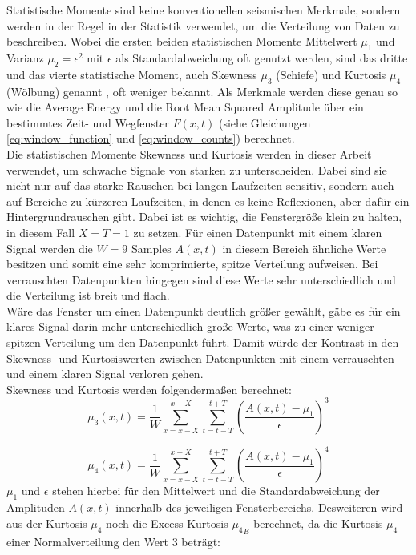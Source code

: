 Statistische Momente sind keine konventionellen seismischen Merkmale, sondern werden in der Regel in der Statistik verwendet, um die Verteilung von Daten zu beschreiben. Wobei die ersten beiden statistischen Momente Mittelwert $\mu_1$ und Varianz $\mu_2 = \epsilon^2$ mit $\epsilon$ als Standardabweichung oft genutzt werden, sind das dritte und das vierte statistische Moment, auch Skewness $\mu_3$ (Schiefe) und Kurtosis $\mu_4$ (Wölbung) genannt \parencite{guthrie_nistsematech_2020}, oft weniger bekannt. Als Merkmale werden diese genau so wie die Average Energy und die Root Mean Squared Amplitude über ein bestimmtes Zeit- und Wegfenster $F(x,t)$ (siehe Gleichungen \ref{eq:window_function} und \ref{eq:window_counts}) berechnet. \\
Die statistischen Momente Skewness und Kurtosis werden in dieser Arbeit verwendet, um schwache Signale von starken zu unterscheiden. Dabei sind sie nicht nur auf das starke Rauschen bei langen Laufzeiten sensitiv, sondern auch auf Bereiche zu kürzeren Laufzeiten, in denen es keine Reflexionen, aber dafür ein Hintergrundrauschen gibt. Dabei ist es wichtig, die Fenstergröße klein zu halten, in diesem Fall $X=T=1$ zu setzen. Für einen Datenpunkt mit einem klaren Signal werden die $W=9$ Samples $A(x,t)$ in diesem Bereich ähnliche Werte besitzen und somit eine sehr komprimierte, spitze Verteilung aufweisen. Bei verrauschten Datenpunkten hingegen sind diese Werte sehr unterschiedlich und die Verteilung ist breit und flach. \\
Wäre das Fenster um einen Datenpunkt deutlich größer gewählt, gäbe es für ein klares Signal darin mehr unterschiedlich große Werte, was zu einer weniger spitzen Verteilung um den Datenpunkt führt. Damit würde der Kontrast in den Skewness- und Kurtosiswerten zwischen Datenpunkten mit einem verrauschten und einem klaren Signal verloren gehen.\\
Skewness und Kurtosis werden folgendermaßen berechnet: \\

\begin{equation}
    \mu_3(x,t) = \frac{1}{W} \sum_{x=x-X}^{x+X} \sum_{t=t-T}^{t+T} \left( \frac{A(x,t) - \mu_1}{\epsilon} \right)^3
\end{equation}

\begin{equation}
    \mu_4(x,t) = \frac{1}{W} \sum_{x=x-X}^{x+X} \sum_{t=t-T}^{t+T} \left( \frac{A(x,t) - \mu_1}{\epsilon} \right)^4
\end{equation}
$\mu_1$ und $\epsilon$ stehen hierbei für den Mittelwert und die Standardabweichung der Amplituden $A(x,t)$ innerhalb des jeweiligen Fensterbereichs. Desweiteren wird aus der Kurtosis $\mu_4$ noch die Excess Kurtosis ${\mu_4}_{E}$ berechnet, da die Kurtosis $\mu_4$ einer Normalverteilung den Wert 3 beträgt:

